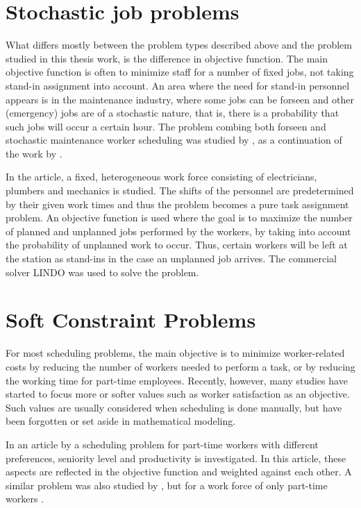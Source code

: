 \section{Stochastic job problems}
What differs mostly between the problem types described above and the problem studied in this thesis work, is the difference in objective function. The main objective function is often to minimize staff for a number of fixed jobs, not taking stand-in assignment into account. An area where the need for stand-in personnel appears is in the  maintenance industry, where some jobs can be forseen and other (emergency) jobs are of a stochastic nature, that is, there is a probability that such jobs will occur a certain hour. The problem combing both forseen and stochastic maintenance worker scheduling was studied by \citet{duffuaa_1999}, as a continuation of the work by \citet{roberts_1983}. 

In the article, a fixed, heterogeneous work force consisting of electricians, plumbers and mechanics is studied. The shifts of the personnel are predetermined by their given work times and thus the problem becomes a pure task assignment problem. An objective function is used where the goal is to maximize the number of planned and unplanned jobs performed by the workers, by taking into account the probability of unplanned work to occur. Thus, certain workers will be left at the station as stand-ins in the case an unplanned job arrives. The commercial solver LINDO was used to solve the problem.


\section{Soft Constraint Problems} \label{WLA}
For most scheduling problems, the main objective is to minimize worker-related costs by reducing the number of workers needed to perform a task, or by reducing the working time for part-time employees. Recently, however, many studies have started to focus more or softer values such as worker satisfaction as an objective. Such values are usually considered when scheduling is done manually, but have been forgotten or set aside in mathematical modeling.

 In an article by \citet{akbari_2013} a scheduling problem for part-time workers with different preferences, seniority level and productivity is investigated. In this article, these aspects are reflected in the objective function and weighted against each other. A similar problem was also studied by \citet{mohan_2008}, but for a work force of only part-time workers . %

